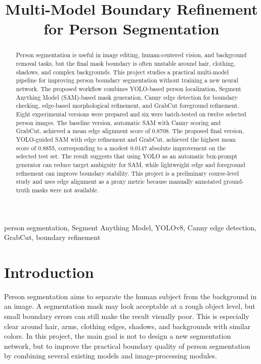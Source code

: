 \documentclass[conference]{IEEEtran}
\begin{document}
\title{Multi-Model Boundary Refinement for Person Segmentation}

\author{
}

\maketitle

\begin{abstract}
Person segmentation is useful in image editing, human-centered vision, and background removal tasks, but the final mask boundary is often unstable around hair, clothing, shadows, and complex backgrounds. This project studies a practical multi-model pipeline for improving person boundary segmentation without training a new neural network. The proposed workflow combines YOLO-based person localization, Segment Anything Model (SAM)-based mask generation, Canny edge detection for boundary checking, edge-based morphological refinement, and GrabCut foreground refinement. Eight experimental versions were prepared and six were batch-tested on twelve selected person images. The baseline version, automatic SAM with Canny scoring and GrabCut, achieved a mean edge alignment score of 0.8708. The proposed final version, YOLO-guided SAM with edge refinement and GrabCut, achieved the highest mean score of 0.8855, corresponding to a modest 0.0147 absolute improvement on the selected test set. The result suggests that using YOLO as an automatic box-prompt generator can reduce target ambiguity for SAM, while lightweight edge and foreground refinement can improve boundary stability. This project is a preliminary course-level study and uses edge alignment as a proxy metric because manually annotated ground-truth masks were not available.
\end{abstract}

\begin{IEEEkeywords}
person segmentation, Segment Anything Model, YOLOv8, Canny edge detection, GrabCut, boundary refinement
\end{IEEEkeywords}

\section{Introduction}
Person segmentation aims to separate the human subject from the background in an image. A segmentation mask may look acceptable at a rough object level, but small boundary errors can still make the result visually poor. This is especially clear around hair, arms, clothing edges, shadows, and backgrounds with similar colors. In this project, the main goal is not to design a new segmentation network, but to improve the practical boundary quality of person segmentation by combining several existing models and image-processing modules.
\end{document}

